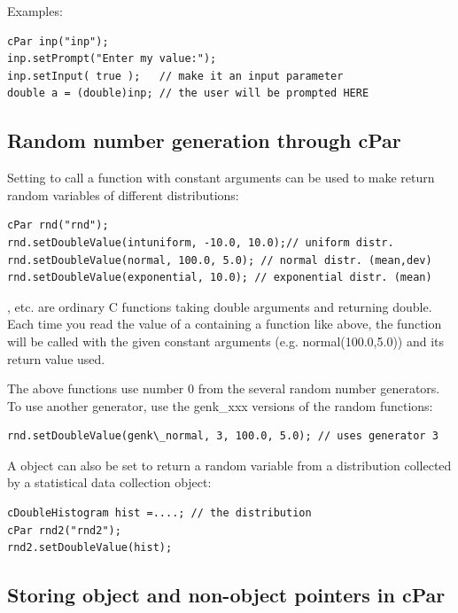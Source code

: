 Examples:

\begin{verbatim}
cPar inp("inp");
inp.setPrompt("Enter my value:");
inp.setInput( true );   // make it an input parameter
double a = (double)inp; // the user will be prompted HERE
\end{verbatim}




\subsection{Random number generation through cPar}

Setting  to call a function with constant arguments can
be used to make  return random variables of different distributions:

\begin{verbatim}
cPar rnd("rnd");
rnd.setDoubleValue(intuniform, -10.0, 10.0);// uniform distr.
rnd.setDoubleValue(normal, 100.0, 5.0); // normal distr. (mean,dev)
rnd.setDoubleValue(exponential, 10.0); // exponential distr. (mean)
\end{verbatim}

,  etc. are ordinary C functions
taking double arguments and returning double. Each time you read the
value of a  containing a function like above, the
function will be called with the given constant arguments (e.g.
normal(100.0,5.0)) and its return value used.


The above functions use number 0 from the several random number
generators. To use another generator, use the genk\_xxx versions
of the random functions:

\begin{verbatim}
rnd.setDoubleValue(genk\_normal, 3, 100.0, 5.0); // uses generator 3
\end{verbatim}

A  object can also be set to return a random variable from
a distribution collected by a statistical data collection object:

\begin{verbatim}
cDoubleHistogram hist =....; // the distribution
cPar rnd2("rnd2");
rnd2.setDoubleValue(hist);
\end{verbatim}




\subsection{Storing object and non-object pointers in cPar}

